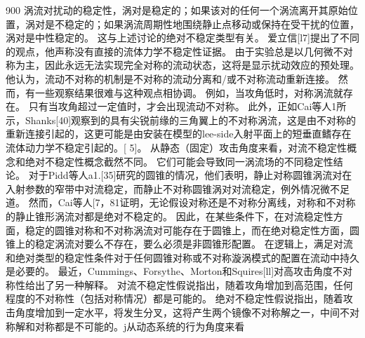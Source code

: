 \documentclass[UTF8,11pt,a4paper,openany,fontset=fandol]{ctexbook}
\begin{document}
900 涡流对扰动的稳定性，涡对是稳定的；如果该对的任何一个涡流离开其原始位置，涡对是不稳定的；如果涡流周期性地围绕静止点移动或保持在受干扰的位置，涡对是中性稳定的。 这与上述讨论的绝对不稳定类型有关。 爱立信[l7]提出了不同的观点，他声称没有直接的流体力学不稳定性证据。 由于实验总是以几何微不对称为主，因此永远无法实现完全对称的流动状态，这将是显示扰动效应的预处理。 他认为，流动不对称的机制是不对称的流动分离和/或不对称流动重新连接。 然而，有一些观察结果很难与这种观点相协调。 例如，当攻角低时，对称涡流就存在。 只有当攻角超过一定值时，才会出现流动不对称。 此外，正如Cai等人1所示，Shanks[40]观察到的具有尖锐前缘的三角翼上的不对称涡流，这是由不对称的重新连接引起的，这更可能是由安装在模型的lee-side入射平面上的短垂直鳍存在流体动力学不稳定引起的。[ 5]。 从静态（固定）攻击角度来看，对流不稳定性概念和绝对不稳定性概念截然不同。 它们可能会导致同一涡流场的不同稳定性结论。 对于Pidd等人a1.[35]研究的圆锥的情况，他们表明，静止对称圆锥涡流对在入射参数的窄带中对流稳定，而静止不对称圆锥涡对对流稳定，例外情况微不足道。 然而，Cai等人[7，81证明，无论假设对称还是不对称分离线，对称和不对称的静止锥形涡流对都是绝对不稳定的。 因此，在某些条件下，在对流稳定性方面，稳定的圆锥对称和不对称涡流对可能存在于圆锥上，而在绝对稳定性方面，圆锥上的稳定涡流对要么不存在，要么必须是非圆锥形配置。 在逻辑上，满足对流和绝对类型的稳定性条件对于任何圆锥对称或不对称漩涡模式的配置在流动中持久是必要的。 最近，Cummings、Forsythe、Morton和Squires[ll]对高攻击角度不对称性给出了另一种解释。 对流不稳定性假说指出，随着攻角增加到高范围，任何程度的不对称性（包括对称情况）都是可能的。 绝对不稳定性假说指出，随着攻击角度增加到一定水平，将发生分叉，这将产生两个镜像不对称解之一，中间不对称解和对称都是不可能的。j从动态系统的行为角度来看
\end{document}
